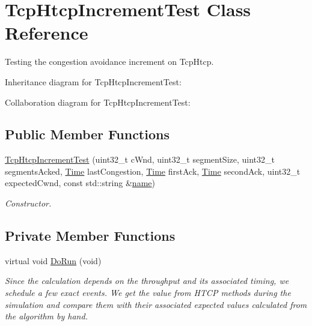 \hypertarget{classTcpHtcpIncrementTest}{}\section{Tcp\+Htcp\+Increment\+Test Class Reference}
\label{classTcpHtcpIncrementTest}


Testing the congestion avoidance increment on Tcp\+Htcp.  




Inheritance diagram for Tcp\+Htcp\+Increment\+Test\+:


Collaboration diagram for Tcp\+Htcp\+Increment\+Test\+:
\subsection*{Public Member Functions}
\begin{DoxyCompactItemize}
\item 
\hyperlink{classTcpHtcpIncrementTest_ad98fd33adc71a8c8c6225575cff5f223}{Tcp\+Htcp\+Increment\+Test} (uint32\+\_\+t c\+Wnd, uint32\+\_\+t segment\+Size, uint32\+\_\+t segments\+Acked, \hyperlink{classns3_1_1Time}{Time} last\+Congestion, \hyperlink{classns3_1_1Time}{Time} first\+Ack, \hyperlink{classns3_1_1Time}{Time} second\+Ack, uint32\+\_\+t expected\+Cwnd, const std\+::string \&\hyperlink{generate__test__data__lte__spectrum__model_8m_ab74e6bf80237ddc4109968cedc58c151}{name})
\begin{DoxyCompactList}\small\item\em Constructor. \end{DoxyCompactList}\end{DoxyCompactItemize}
\subsection*{Private Member Functions}
\begin{DoxyCompactItemize}
\item 
virtual void \hyperlink{classTcpHtcpIncrementTest_a0fa1bb539a4ff1b134949e80608d0ffa}{Do\+Run} (void)
\begin{DoxyCompactList}\small\item\em Since the calculation depends on the throughput and its associated timing, we schedule a few exact events. We get the value from H\+T\+CP methods during the simulation and compare them with their associated expected values calculated from the algorithm by hand. \end{DoxyCompactList}\end{DoxyCompactItemize}
